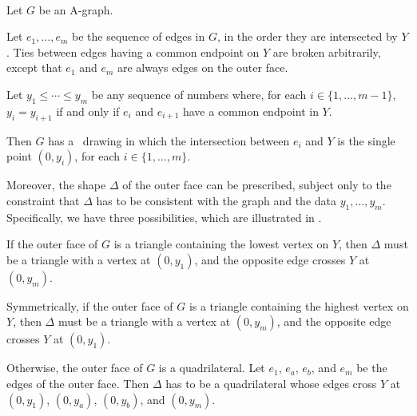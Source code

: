 \begin{thm}\ \newline
\begin{compactitem}
\item Let $G$ be an A-graph.
\item Let $e_1,\ldots,e_m$ be the sequence of edges in $G$,
  in the order they are intersected by $Y$. Ties between edges having
  a common endpoint on $Y$ are broken arbitrarily,
except that $e_1$ and $e_m$ are
always edges on the outer face.
\item Let $y_1\le\cdots\le y_m$ be any sequence of numbers where, for
  each $i\in\{1,\ldots,m-1\}$, $y_i=y_{i+1}$ if and only if $e_i$
  and $e_{i+1}$ have a common endpoint in $Y$.
			
			
\end{compactitem}
Then $G$ has a \Fary\ drawing in which the intersection
between $e_i$ and $Y$ is the single point $(0,y_i)$, for each
$i\in\{1,\ldots,m\}$.

Moreover, the shape  $\Delta$ of the outer face can be prescribed,
subject only to the constraint that $\Delta$
has to be consistent with the graph and the data $y_1,\ldots,y_m$.
Specifically, we have three possibilities, which
 are illustrated in .

\begin{compactenum}[a)]
\item If the outer face of $G$ is a triangle containing the lowest
  vertex on $Y$, then $\Delta$ must be a triangle with a vertex at
	$(0,y_1)$, and the opposite edge crosses $Y$ at $(0,y_m)$.
\item Symmetrically, if the outer face of $G$ is a triangle containing
  the highest vertex on $Y$, then $\Delta$ must be a triangle with a vertex
	at $(0,y_m)$, and the opposite edge crosses $Y$ at $(0,y_1)$.
\item Otherwise, the outer face of $G$ is a quadrilateral.  Let $e_1$,
  $e_a$, $e_b$, and $e_m$ be the %
  edges of the outer face.  Then $\Delta$ has to be a quadrilateral
	whose edges cross $Y$ at $(0,y_1)$, $(0,y_a)$, $(0,y_b)$, and $(0,y_m)$.
\end{compactenum}
\end{thm}

